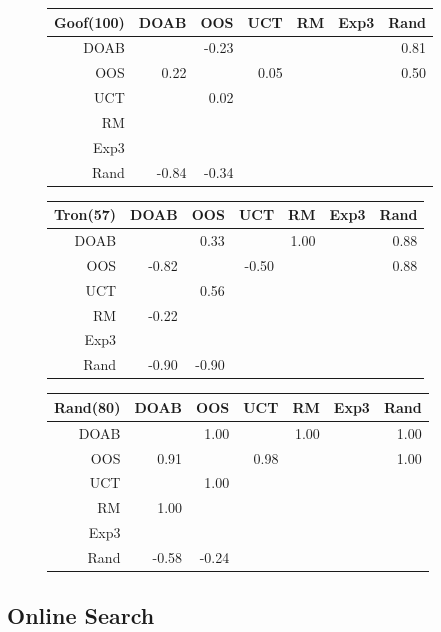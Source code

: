 \begin{figure}
\begin{tabular}{|r|rrrrrr|}\hline
Goof(100) & DOAB & OOS & UCT & RM  & Exp3 & Rand\\\hline
DOAB &      &-0.23&     &     &      &0.81 \\ 
OOS  &0.22  &     & 0.05&     &      &0.50 \\
UCT  &      &0.02 &     &     &      &     \\
RM   &      &     &     &     &      &     \\
Exp3 &      &     &     &     &      &     \\
Rand &-0.84 &-0.34&     &     &      &     \\\hline
\end{tabular}

\begin{tabular}{|r|rrrrrr|}\hline
Tron(57) & DOAB & OOS & UCT & RM  & Exp3 & Rand\\\hline
DOAB &      &0.33 &     &1.00 &      &0.88 \\ 
OOS  &-0.82 &     &-0.50&     &      &0.88 \\
UCT  &      &0.56 &     &     &      &     \\
RM   &-0.22 &     &     &     &      &     \\
Exp3 &      &     &     &     &      &     \\
Rand &-0.90 &-0.90&     &     &      &     \\\hline
\end{tabular}

\begin{tabular}{|r|rrrrrr|}\hline
Rand(80) & DOAB & OOS & UCT & RM  & Exp3 & Rand\\\hline
DOAB &      &1.00 &     &1.00 &      &1.00 \\ 
OOS  &0.91  &     &0.98 &     &      &1.00 \\
UCT  &      &1.00 &     &     &      &     \\
RM   &1.00  &     &     &     &      &     \\
Exp3 &      &     &     &     &      &     \\
Rand &-0.58 &-0.24&     &     &      &     \\\hline
\end{tabular}
\end{figure}

\subsection{Online Search}




